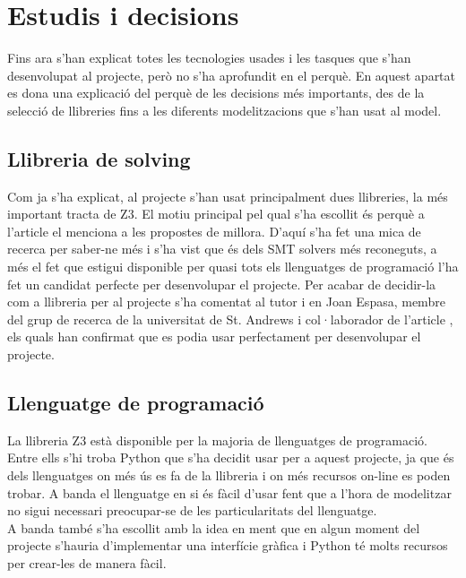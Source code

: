 


\chapter{Estudis i decisions} %

\label{Estudis i decisions} %

Fins ara s'han explicat totes les tecnologies usades i les tasques que s'han desenvolupat al projecte, però no s'ha aprofundit en el perquè. En aquest apartat es dona una explicació del perquè de les decisions més importants, des de la selecció de llibreries fins a les diferents modelitzacions que s'han usat al model.

\section{Llibreria de solving}
Com ja s'ha explicat, al projecte s'han usat principalment dues llibreries, la més important tracta de Z3. El motiu principal pel qual s'ha escollit és perquè a l'article \cite{arxivpaper} el menciona a les propostes de millora. D'aquí s'ha fet una mica de recerca per saber-ne més i s'ha vist que és dels SMT solvers més reconeguts, a més el fet que estigui disponible per quasi tots els llenguatges de programació l'ha fet un candidat perfecte per desenvolupar el projecte. Per acabar de decidir-la com a llibreria per al projecte s'ha comentat al tutor i en Joan Espasa, membre del grup de recerca de la universitat de St. Andrews i col·laborador de l'article \cite{arxivpaper}, els quals han confirmat que es podia usar perfectament per desenvolupar el projecte.\\

\section{Llenguatge de programació}
La llibreria Z3 \cite{Z3Prover} està disponible per la majoria de llenguatges de programació. Entre ells s'hi troba Python que s'ha decidit usar per a aquest projecte, ja que és dels llenguatges on més ús es fa de la llibreria i on més recursos on-line es poden trobar. A banda el llenguatge en si és fàcil d'usar fent que a l'hora de modelitzar no sigui necessari preocupar-se de les particularitats del llenguatge.\\
A banda també s'ha escollit amb la idea en ment que en algun moment del projecte s'hauria d'implementar una interfície gràfica i Python té molts recursos per crear-les de manera fàcil.

